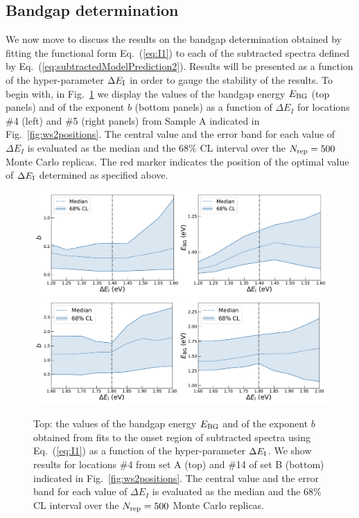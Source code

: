 \subsection{Bandgap determination}

We now move to discuss the results on the bandgap determination obtained
by fitting the functional form Eq.~(\ref{eq:I1}) to each of the subtracted
spectra defined by Eq.~(\ref{eq:subtractedModelPrediction2}).
%
Results will be presented as a function of the hyper-parameter $\Delta E_{\rm I}$
in order to gauge the stability of the results.
%
To begin with, in Fig.~\ref{fig:bvalues}
we display the values of the bandgap energy $E_{\rm BG}$ (top panels)
and of the exponent $b$ (bottom panels) as a function of $\Delta E_I$
for locations \#4 (left)
and \#5 (right panels) from Sample A indicated in Fig.~\ref{fig:ws2positions}.
%
The central value and the error band for each value of $\Delta E_I$ is evaluated
as the median and the 68\% CL interval over the $N_{\rm rep}=500$ Monte Carlo replicas.
%
The red marker indicates the position of the optimal value of
$\Delta E_{\rm I}$ determined as specified above.


\begin{figure}[t]
\begin{centering}
  \includegraphics[width=0.6\linewidth]{plots/Stabilityplots_sp4.pdf}
  \includegraphics[width=0.6\linewidth]{plots/Stability_plots_sp14.pdf} 
  \caption{Top: the values of the bandgap energy $E_{\rm BG}$ and of the exponent $b$
  obtained from fits to the onset
  region of subtracted spectra using Eq.~(\ref{eq:I1}) as a function
  of the hyper-parameter $\Delta E_{\rm I}$.
  We show results for locations \#4 from set A (top)
  and \#14 of set B (bottom) indicated in Fig.~\ref{fig:ws2positions}.
  The central value and the error band for each value of $\Delta E_I$ is evaluated
  as the median and the 68\% CL interval over the $N_{\rm rep}=500$ Monte Carlo replicas.
  }
\label{fig:bvalues}
\end{centering}
\end{figure}

